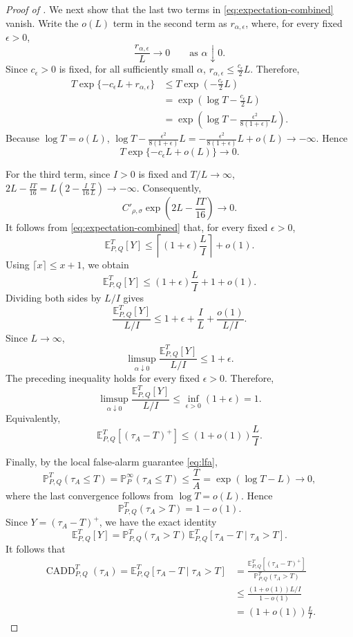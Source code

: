 \documentclass[12pt]{article}
\theoremstyle{spaced}
\theoremstyle{remark}
\begin{document}
\begin{proof}[Proof of ]
We next show that the last two terms in
\eqref{eq:expectation-combined} vanish. Write the $o(L)$ term in the
second term as $r_{\alpha,\epsilon}$, where, for every fixed
$\epsilon>0$,
\[
\frac{r_{\alpha,\epsilon}}{L}\longrightarrow 0
\qquad\text{as }\alpha\downarrow0.
\]
Since $c_\epsilon>0$ is fixed, for all sufficiently small $\alpha$,
$r_{\alpha,\epsilon}
\le
\frac{c_\epsilon}{2}L.$
Therefore,
\begin{align*}
T\exp\{-c_\epsilon L+r_{\alpha,\epsilon}\}
&\le
T\exp\left(-\frac{c_\epsilon}{2}L\right)\\
&=
\exp\left(
\log T-\frac{c_\epsilon}{2}L
\right)\\
&=
\exp\left(
\log T-
\frac{\epsilon^2}{8(1+\epsilon)}L
\right).
\end{align*}
Because $\log T=o(L)$,
$\log T-
\frac{\epsilon^2}{8(1+\epsilon)}L
=
-\frac{\epsilon^2}{8(1+\epsilon)}L+o(L)
\longrightarrow-\infty.$
Hence
\[
T\exp\{-c_\epsilon L+o(L)\}\longrightarrow0.
\]

For the third term, since $I>0$ is fixed and $T/L\to\infty$,
$2L-\frac{IT}{16}
=
L\left(
2-\frac{I}{16}\frac{T}{L}
\right)
\longrightarrow-\infty.$
Consequently,
\[
C'_{\rho,\sigma}
\exp\left(2L-\frac{IT}{16}\right)
\longrightarrow0.
\]
It follows from \eqref{eq:expectation-combined} that, for every fixed
$\epsilon>0$,
\[
\mathbb E^T_{P,Q}[Y]
\le
\left\lceil
(1+\epsilon)\frac{L}{I}
\right\rceil
+o(1).
\]
Using $\lceil x\rceil\le x+1$, we obtain
\[
\mathbb E^T_{P,Q}[Y]
\le
(1+\epsilon)\frac{L}{I}+1+o(1).
\]
Dividing both sides by $L/I$ gives
\[
\frac{\mathbb E^T_{P,Q}[Y]}{L/I}
\le
1+\epsilon+\frac{I}{L}
+\frac{o(1)}{L/I}.
\]
Since $L\to\infty$,
\[
\limsup_{\alpha\downarrow0}
\frac{\mathbb E^T_{P,Q}[Y]}{L/I}
\le
1+\epsilon.
\]
The preceding inequality holds for every fixed $\epsilon>0$.
Therefore,
\[
\limsup_{\alpha\downarrow0}
\frac{\mathbb E^T_{P,Q}[Y]}{L/I}
\le
\inf_{\epsilon>0}(1+\epsilon)
=
1.
\]
Equivalently,
\[
\mathbb E^T_{P,Q}
\left[(\tau_A-T)^+\right]
\le
(1+o(1))\frac{L}{I}.
\]

Finally, by the local false-alarm guarantee \eqref{eq:lfa},
\[
\mathbb P^T_{P,Q}(\tau_A\le T)
=
\mathbb P^\infty_P(\tau_A\le T)
\le
\frac{T}{A}
=
\exp(\log T-L)
\longrightarrow0,
\]
where the last convergence follows from $\log T=o(L)$. Hence
\[
\mathbb P^T_{P,Q}(\tau_A>T)=1-o(1).
\]
Since $Y=(\tau_A-T)^+$, we have the exact identity
\[
\mathbb E^T_{P,Q}[Y]
=
\mathbb P^T_{P,Q}(\tau_A>T)
\,
\mathbb E^T_{P,Q}
[\tau_A-T\mid \tau_A>T].
\]
It follows that
\begin{align*}
\operatorname{CADD}_{P,Q}^{T}(\tau_A)
=
\mathbb E^T_{P,Q}
[\tau_A-T\mid \tau_A>T]
&=
\frac{
\mathbb E^T_{P,Q}[(\tau_A-T)^+]
}{
\mathbb P^T_{P,Q}(\tau_A>T)
}\\
&\le
\frac{
(1+o(1))L/I
}{
1-o(1)
}\\
&=
(1+o(1))\frac{L}{I}.
\end{align*}
\end{proof}
\end{document}
